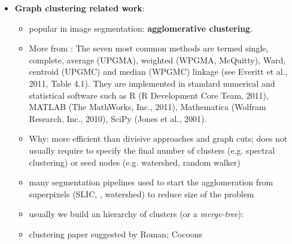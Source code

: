\begin{itemize}
\item \textbf{Graph clustering related work}:
\begin{itemize}
    \item popular in image segmentation: \textbf{agglomerative clustering}.
    \item {\small More from \cite{mullner2011modern}: The seven most common methods are termed single, complete, average (UPGMA), weighted (WPGMA, McQuitty), Ward, centroid (UPGMC) and median (WPGMC) linkage (see Everitt et al., 2011, Table 4.1). They are implemented in standard numerical and statistical software such as R (R Development Core Team, 2011), MATLAB (The MathWorks, Inc., 2011), Mathematica (Wolfram Research, Inc., 2010), SciPy (Jones et al., 2001).}
    \item Why: more efficient than divisive approaches and graph cuts; does not usually require to specify the final number of clusters (e.g. spectral clustering) or seed nodes (e.g. watershed, random walker) 
    \item many segmentation pipelines used to start the agglomeration from superpixels (SLIC, \cite{felzenszwalb2004efficient}, watershed) to reduce size of the problem 
    \item usually we build an hierarchy of clusters (or a \emph{merge-tree}): 
    \item clustering paper suggested by Roman; Cocoons

 
\begin{itemize}


\end{itemize}
\end{itemize}
\end{itemize}
